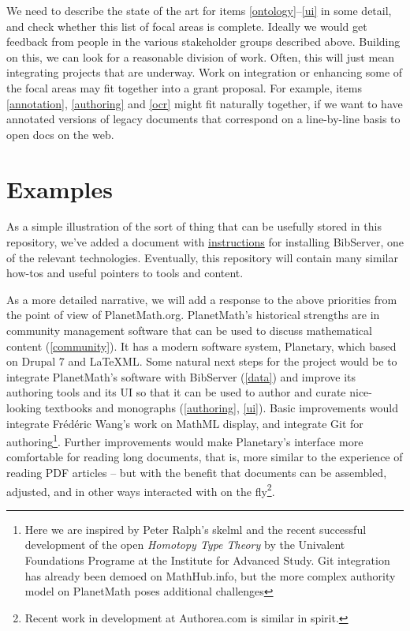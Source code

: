 \documentclass{article}
\begin{document}
We need to describe the state of the art for items \ref{ontology}--\ref{ui} in some detail, and check whether this list of focal areas is complete.  Ideally we would get feedback from people in the various stakeholder groups described above.  Building on this, we can look for a reasonable division of work.  Often, this will just mean integrating projects that are underway.  Work on integration or enhancing some of the focal areas may fit together into a grant proposal.  For example, items \ref{annotation}, \ref{authoring} and \ref{ocr} might fit naturally together, if we want to have annotated versions of legacy documents that correspond on a line-by-line basis to open docs on the web.

\section{Examples}

As a simple illustration of the sort of thing that can be usefully stored in this repository, we've added a document with \href{http://holtzermann17.github.io/skelodml/bibserver-setup.html}{instructions} for installing BibServer, one of the relevant technologies.  Eventually, this repository will contain many similar how-tos and useful pointers to tools and content.

As a more detailed narrative, we will add a response to the above priorities from the point of view of PlanetMath.org.  PlanetMath's historical strengths are in community management software that can be used to discuss mathematical content (\ref{community}).  It has a modern software system, Planetary, which based on Drupal 7 and LaTeXML.  Some natural next steps for the project would be to integrate PlanetMath's software with BibServer (\ref{data}) and improve its authoring tools and its UI so that it can be used to author and curate nice-looking textbooks and monographs (\ref{authoring}, \ref{ui}).  Basic improvements would integrate Fr\'ed\'eric Wang's work on MathML display, and integrate Git for authoring\footnote{Here we are inspired by  Peter Ralph's skelml and the recent successful development of the open \emph{Homotopy Type Theory} by the Univalent Foundations Programe at the Institute for Advanced Study.  Git integration has already been demoed on MathHub.info, but the more complex authority model on PlanetMath poses additional challenges}.  Further improvements would make Planetary's interface more comfortable for reading long documents, that is, more similar to the experience of reading PDF articles -- but with the benefit that documents can be assembled, adjusted, and in other ways interacted with on the fly\footnote{Recent work in development at Authorea.com is similar in spirit.}.
\end{document}
